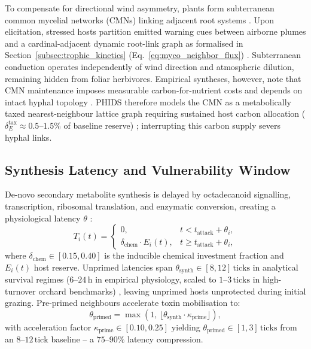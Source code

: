 To compensate for directional wind asymmetry, plants form subterranean common mycelial networks (CMNs) linking adjacent root systems \cite{babikova2013underground}. Upon elicitation, stressed hosts partition emitted warning cues between airborne plumes and a cardinal-adjacent dynamic root-link graph as formalised in Section~\ref{subsec:trophic_kinetics} (Eq.~\ref{eq:myco_neighbor_flux}) \cite{babikova2013underground}. Subterranean conduction operates independently of wind direction and atmospheric dilution, remaining hidden from foliar herbivores. Empirical syntheses, however, note that CMN maintenance imposes measurable carbon-for-nutrient costs and depends on intact hyphal topology \cite{karst2023positive, henriksson2023reexamining}. PHIDS therefore models the CMN as a metabolically taxed nearest-neighbour lattice graph requiring sustained host carbon allocation ($\delta_E^{\text{tax}} \approx 0.5\text{--}1.5\%$ of baseline reserve) \cite{babikova2013underground, henriksson2023reexamining}; interrupting this carbon supply severs hyphal links.



\subsection{Synthesis Latency and Vulnerability Window}
\label{subsec:latency_window}

De-novo secondary metabolite synthesis is delayed by octadecanoid signalling, transcription, ribosomal translation, and enzymatic conversion, creating a physiological latency $\theta$ \cite{gatehouse2002plant}:
\begin{equation}
  T_i(t) =
  \begin{cases}
    0, & t < t_{\text{attack}} + \theta_i, \\
    \delta_{\text{chem}} \cdot E_i(t), & t \ge t_{\text{attack}} + \theta_i,
  \end{cases}
  \label{eq:toxin_latency}
\end{equation}
where $\delta_{\text{chem}} \in [0.15, 0.40]$ is the inducible chemical investment fraction and $E_i(t)$ host reserve. Unprimed latencies span $\theta_{\text{synth}} \in [8, 12]\,\text{ticks}$ in analytical survival regimes ($6\text{--}24\,\text{h}$ in empirical physiology, scaled to $1\text{--}3\,\text{ticks}$ in high-turnover orchard benchmarks) \cite{gatehouse2002plant}, leaving unprimed hosts unprotected during initial grazing. Pre-primed neighbours accelerate toxin mobilisation to:
\begin{equation}
  \theta_{\text{primed}} = \max\left(1, \, \lfloor \theta_{\text{synth}} \cdot \kappa_{\text{prime}} \rfloor\right),
\end{equation}
with acceleration factor $\kappa_{\text{prime}} \in [0.10, 0.25]$ yielding $\theta_{\text{primed}} \in [1, 3]\,\text{ticks}$ from an $8\text{--}12\,\text{tick}$ baseline -- a $75\text{--}90\%$ latency compression.

